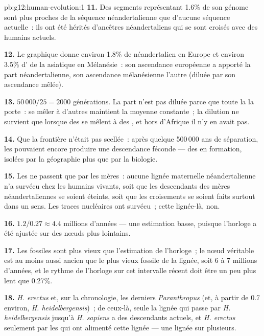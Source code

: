 \begin{solution}{pb:g12:human-evolution:1}
\textbf{11.} Des segments représentant 1.6\% de son génome sont plus
proches de la séquence néandertalienne que d'aucune séquence
actuelle~: ils ont été hérités d'ancêtres néandertaliens qui se sont
croisés avec des humains actuels.

\textbf{12.} Le graphique donne environ 1.8\% de néandertalien en
Europe et environ 3.5\% d' de la  asiatique en
Mélanésie~: son ascendance européenne a apporté la part
néandertalienne, son ascendance mélanésienne l'autre (diluée par son
ascendance mêlée).

\textbf{13.} $50\,000/25 = 2000$ générations. La part n'est pas diluée
parce que toute la  la porte~: se mêler à d'autres 
maintient la moyenne constante~; la dilution ne survient que lorsque
des  se mêlent à des , et hors d'Afrique il n'y en
avait pas.

\textbf{14.} Que la frontière n'était pas scellée~: après quelque
500\,000 ans de séparation, les  pouvaient encore produire
une descendance féconde --- des  en formation, isolées par la
géographie plus que par la biologie.

\textbf{15.} Les  ne passent que par les mères~: aucune
lignée maternelle néandertalienne n'a survécu chez les humains
vivants, soit que les descendants des mères néandertaliennes se soient
éteints, soit que les croisements se soient faits surtout dans un
sens. Les traces nucléaires ont survécu~; cette lignée-là, non.

\textbf{16.} $1.2/0.27 \approx 4.4$ millions d'années --- une
estimation basse, puisque l'horloge a été ajustée sur des nœuds plus
lointains.

\textbf{17.} Les fossiles sont plus vieux que l'estimation de
l'horloge~; le nœud véritable est au moins aussi ancien que le plus
vieux fossile de la lignée, soit 6 à 7 millions d'années, et le rythme
de l'horloge sur cet intervalle récent doit être un peu plus lent que
0.27\%.

\textbf{18.} \emph{H. erectus} et, sur la chronologie, les derniers
\emph{Paranthropus} (et, à partir de 0.7 environ,
\emph{H. heidelbergensis})~; de ceux-là, seule la lignée qui passe par
\emph{H. heidelbergensis} jusqu'à \emph{H. sapiens} a des descendants
actuels, et \emph{H. erectus} seulement par les  qui ont
alimenté cette lignée --- une lignée sur plusieurs.


\end{solution}
